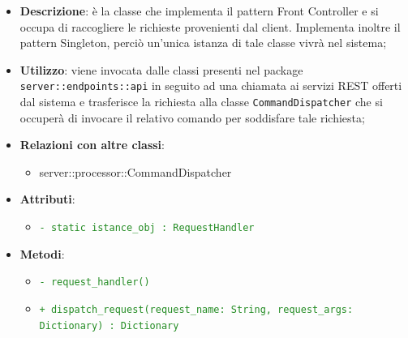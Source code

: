     \begin{itemize}
      \item \textbf{Descrizione}: è la classe che implementa il pattern Front Controller e si occupa di raccogliere le richieste provenienti dal client. Implementa inoltre il pattern Singleton, perciò un'unica istanza di tale classe vivrà nel sistema;
      \item \textbf{Utilizzo}: viene invocata dalle classi presenti nel package \texttt{server::endpoints::api} in seguito ad una chiamata ai servizi REST offerti dal sistema e trasferisce la richiesta alla classe \texttt{CommandDispatcher} che si occuperà di invocare il relativo comando per soddisfare tale richiesta;
      \item \textbf{Relazioni con altre classi}:
        \begin{itemize}
          \item server::processor::CommandDispatcher
        \end{itemize}
      \item \textbf{Attributi}:
          \begin{itemize}
              \item \textcolor{forestgreen}{\texttt{- static istance\_obj : RequestHandler}}
          \end{itemize}
      \item \textbf{Metodi}:
          \begin{itemize}
             \item \textcolor{forestgreen}{\texttt{- request\_handler()}}
             \item \textcolor{forestgreen}{\texttt{+ dispatch\_request(request\_name: String, request\_args: Dictionary) : Dictionary}}
\end{itemize}
\end{itemize}
